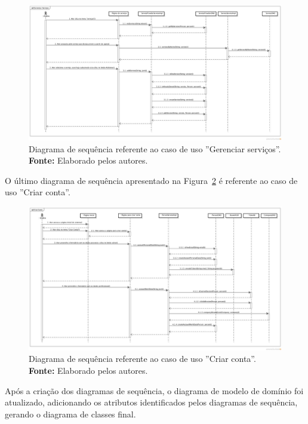 \begin{landscape}
\newpage
\captionsetup[figure]{list=no}
\begin{figure}[h!]
	\centerline{\includegraphics[scale=0.35]{./imagens/apendices/diagrama-sequencia-gerenciar-servicos.png}}
	\caption[Diagrama de sequência referente ao caso de uso ''Gerenciar serviços''.]
	{Diagrama de sequência referente ao caso de uso ''Gerenciar serviços''. \textbf{Fonte:} Elaborado pelos autores.}
	\label{fig:ap1:diagrama_sequencia_gerenciar_servicos}
\end{figure}

O último diagrama de sequência apresentado na Figura~\ref{fig:ap1:diagrama_sequencia_criar_conta} é referente ao caso de uso ''Criar conta''.

\newpage
\captionsetup[figure]{list=no}
\begin{figure}[h!]
	\centerline{\includegraphics[scale=0.35]{./imagens/apendices/diagrama-sequencia-criar-conta.png}}
	\caption[Diagrama de sequência referente ao caso de uso ''Criar conta''.]
	{Diagrama de sequência referente ao caso de uso ''Criar conta''. \textbf{Fonte:} Elaborado pelos autores.}
	\label{fig:ap1:diagrama_sequencia_criar_conta}
\end{figure}
\end{landscape}

Após a criação dos diagramas de sequência, o diagrama de modelo de domínio foi atualizado, adicionando os atributos identificados pelos diagramas de sequência, gerando o diagrama de classes final.
